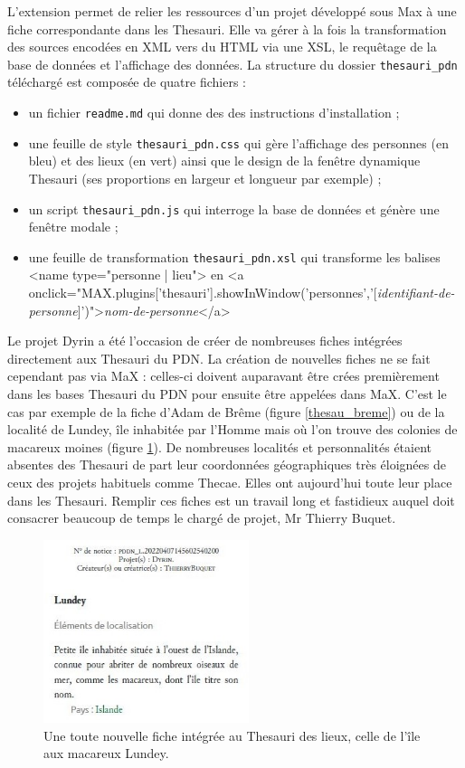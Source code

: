 \documentclass[a4paper,12pt,twoside]{book}
\begin{document}
L'extension permet de relier les ressources d'un projet développé sous Max à une fiche correspondante dans les Thesauri. Elle va gérer à la fois la transformation des sources encodées en XML vers du \acrshort{HTML} via une \acrshort{XSL}, le requêtage de la base de données et l'affichage des données. La structure du dossier \texttt{thesauri\_pdn} téléchargé est composée de quatre fichiers :
\begin{itemize}
    \item un fichier \texttt{readme.md} qui donne des  des instructions d'installation ;
    \item une feuille de style  \texttt{thesauri\_pdn.css} qui gère l'affichage des personnes (en bleu) et des lieux (en vert) ainsi que le design de la fenêtre dynamique Thesauri (ses proportions en largeur et longueur par exemple) ;
    \item un script \texttt{thesauri\_pdn.js} qui interroge la base de données et génère une fenêtre modale ;
    \item une feuille de transformation \texttt{thesauri\_pdn.xsl} qui transforme les balises <name type="personne | lieu"> en <a onclick="MAX.plugins['thesauri'].showInWindow('personnes','[\textit{identifiant-de-personne}]')">\textit{nom-de-personne}</a>
\end{itemize}

Le projet Dyrin a été l'occasion de créer de nombreuses fiches intégrées directement aux Thesauri du \acrshort{PDN}. La création de nouvelles fiches ne se fait cependant pas via MaX : celles-ci doivent auparavant être crées premièrement dans les bases Thesauri du \acrshort{PDN} pour ensuite être appelées dans MaX.  C'est le cas par exemple de la fiche d'Adam de Brême (figure \ref{thesau_breme}) ou de la localité de Lundey, île inhabitée par l'Homme mais où l'on trouve des colonies de macareux moines (figure \ref{lundey}). De nombreuses localités et personnalités étaient absentes des Thesauri de part leur coordonnées géographiques très éloignées de ceux des projets habituels comme Thecae. Elles ont aujourd'hui toute leur place dans les Thesauri. Remplir ces fiches est un travail long et fastidieux auquel doit consacrer beaucoup de temps le chargé de projet, Mr Thierry Buquet.

\begin{figure}[H]
    \centering
    \includegraphics[width=6cm]{img/partie_3/lundey.JPG}
    \caption{Une toute nouvelle fiche intégrée au Thesauri des lieux, celle de l'île aux macareux Lundey.}
    \label{lundey}
\end{figure}
\end{document}
